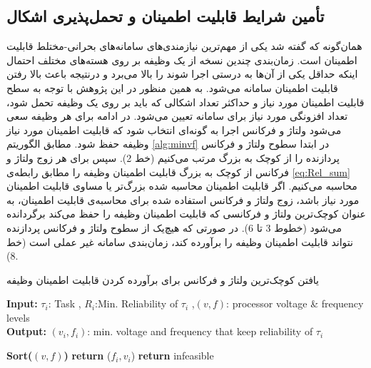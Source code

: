 \subsection{تأمین شرایط قابلیت اطمینان و تحمل‌پذیری اشکال}
همان‌گونه که گفته شد یکی از مهم‌ترین نیازمندی‌های سامانه‌های بحرانی-مختلط قابلیت اطمینان است. زمان‌بندی چندین نسخه از یک وظیفه بر روی هسته‌های مختلف احتمال اینکه حداقل یکی از آن‌ها به درستی اجرا شوند را بالا می‌برد و درنتیجه باعث بالا رفتن قابلیت اطمینان سامانه می‌شود\cite{Pathan2014}. به همین منظور در این پژوهش با توجه به سطح قابلیت اطمینان مورد نیاز و حداکثر تعداد اشکالی که باید بر روی یک وظیفه تحمل شود، تعداد افزونگی مورد نیاز برای سامانه تعیین می‌شود. در ادامه برای هر وظیفه سعی می‌شود ولتاژ و فرکانس اجرا به گونه‌ای انتخاب شود که قابلیت اطمینان مورد نیاز وظیفه حفظ شود. مطابق الگوریتم \ref{alg:minvf}  در ابتدا سطوح ولتاژ و فرکانس پردازنده را از کوچک به بزرگ مرتب می‌کنیم (خط 2). سپس برای هر زوج ولتاژ و فرکانس از کوچک به بزرگ قابلیت اطمینان وظیفه را مطابق رابطه‌ی \ref{eq:Rel_sum}  محاسبه‌ می‌کنیم. اگر قابلیت اطمینان  محاسبه شده بزرگ‌تر یا مساوی قابلیت اطمینان مورد نیاز باشد، زوج ولتاژ و فرکانس استفاده شده برای محاسبه‌ی قابلیت اطمینان، به عنوان کوچک‌ترین ولتاژ و فرکانسی که قابلیت اطمینان وظیفه را حفظ می‌کند برگردانده می‌شود (خطوط 3 تا 6). در صورتی که هیچ‌یک از سطوح ولتاژ و فرکانس پردازنده نتواند قابلیت اطمینان وظیفه را برآورده کند، زمان‌بندی سامانه غیر عملی است (خط 8).\\
	\begin{algorithm}[H]
		\caption{یافتن کوچک‌ترین ولتاژ و فرکانس برای برآورده کردن قابلیت اطمینان وظیفه}
		\label{alg:minvf}
		\latin
		\textbf{Input:} $\tau_i$: Task , $R_i$:Min. Reliability of $\tau_i$ ,$(v,f)$: processor voltage \& frequency levels  \\
		\textbf{Output:} $(v_i,f_i)$: min. voltage and frequency that keep reliability of $\tau_i$	
		\begin{algorithmic}[1]
			\State \textbf{Sort($(v,f)$)} 
			\State \textbf{return} ($f_i,v_i$)
			\EndIf
			\EndFor		
			\State \textbf{return} infeasible		
			\EndFunction		
		\end{algorithmic}
	\end{algorithm}

